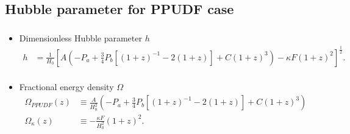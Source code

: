 \documentclass{beamer}
\newcommand{\brac}[1]{\left(#1\right)}
\newcommand{\bracc}[1]{\left[#1\right]}
\begin{document}
{\subsection{Hubble parameter for PPUDF case}
\begin{frame}
\frametitle{\insertsectionhead}
\framesubtitle{\insertsubsectionhead}
\fontsize{8pt}{7.2}\selectfont
\begin{itemize}
\item Dimensionless Hubble parameter $h$
\fontsize{6pt}{7.2}\selectfont
\begin{equation}\label{eq:UDFDimh}
\begin{split}
h &= \frac{1}{H_{0}}\bracc{A\brac{-P_{a}+\frac{3}{4}P_{b}\bracc{\brac{1+z}^{-1}-2\brac{1+z}}+C\brac{1+z}^{3}} -\kappa F \brac{1+z}^{2}}^{\frac{1}{2}}.\\
\end{split}
\end{equation}
\fontsize{8pt}{7.2}\selectfont
\item Fractional energy density $\Omega$
\fontsize{6pt}{7.2}\selectfont
\begin{equation}\label{eq:UDFOmega}
\begin{split}
\Omega_{PPUDF}(z) &\equiv \frac{A}{H_{0}^{2}}\brac{-P_{a}+\frac{3}{4}P_{b}\bracc{\brac{1+z}^{-1}-2\brac{1+z}}+C\brac{1+z}^{3}}      \\
\Omega_{\kappa}(z)&\equiv -\frac{\kappa F}{H_{0}^{2}}\brac{1+z}^{2}.\\
\end{split}
\end{equation}
\end{itemize}


\end{frame}}
\end{document}
